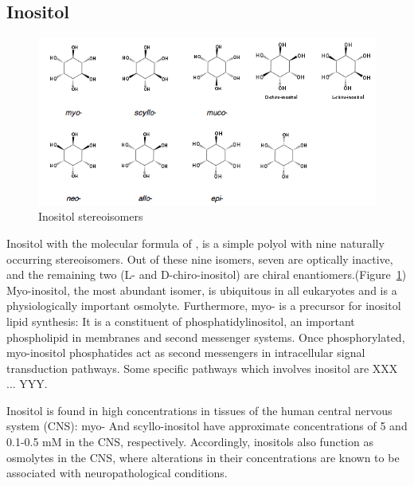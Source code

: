 \subsection{Inositol}
\begin{figure}
	\centering
	\includegraphics[width=6in]{figures/introduction/inositol.png}
	\caption[Inositol]{Inositol stereoisomers}
	\label{fig:inositols}
\end{figure}

Inositol with the molecular formula of , is a simple polyol with nine naturally occurring stereoisomers. Out of these nine isomers, seven are optically inactive, and the remaining two (L- and D-chiro-inositol) are chiral enantiomers.(Figure~\ref{fig:inositols}) Myo-inositol, the most abundant isomer, is ubiquitous in all eukaryotes and is a physiologically important osmolyte.  Furthermore, myo- is a precursor for inositol lipid synthesis: It is a constituent of phosphatidylinositol, an important phospholipid in membranes and second messenger systems. Once phosphorylated, myo-inositol phosphatides act as second messengers in intracellular signal transduction pathways.\cite{Fisher:2002tk} Some specific pathways which involves inositol are XXX ... YYY.\cite{That nature paper from 2008 on inositides}

Inositol is found in high concentrations in tissues of the human central nervous system (CNS): myo- And scyllo-inositol have approximate concentrations of 5 and 0.1-0.5 mM in the CNS, respectively.\cite{Fisher:2002tk} Accordingly, inositols also function as osmolytes in the CNS, where alterations in their concentrations are known to be associated with neuropathological conditions.\cite{Michaelis:1993gf, Fisher:2002tk}

